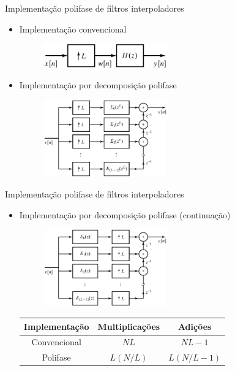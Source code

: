 \begin{slide}{Implementação polifase de filtros interpoladores}
	\begin{itemize}
		\item Implementação convencional
			\begin{figure}
				\centering
				\includegraphics[width=0.5\textwidth]{figs/4-41.eps}
			\end{figure}
		\item Implementação por decomposição polifase
			\begin{figure}
				\centering
				\includegraphics[width=0.5\textwidth]{figs/4-42.eps}
			\end{figure}
	\end{itemize}
\end{slide}

\begin{slide}{Implementação polifase de filtros interpoladores}
	\begin{itemize}
		\item Implementação por decomposição polifase (continuação)
			\begin{figure}
				\centering
				\includegraphics[width=0.5\textwidth]{figs/4-43.eps}
			\end{figure}
			\begin{table}
				\begin{tabular}[h]{c|c|c}
					\hline
					Implementação & Multiplicações & Adições\\
				        \hline	
					Convencional &   $NL$ & $NL-1$ \\
					Polifase     & $L(N/L)$ & $L(N/L -1 )$\\
					\hline
				\end{tabular}
			\end{table}
	\end{itemize}
\end{slide}

